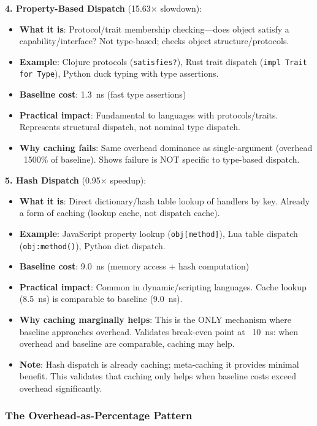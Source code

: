 \documentclass[sigplan,final]{acmart}
\begin{document}
\textbf{4. Property-Based Dispatch} (15.63× slowdown):
\begin{itemize}
  \item \textbf{What it is}: Protocol/trait membership checking—does object satisfy a capability/interface? Not type-based; checks object structure/protocols.
  \item \textbf{Example}: Clojure protocols (\texttt{satisfies?}), Rust trait dispatch (\texttt{impl Trait for Type}), Python duck typing with type assertions.
  \item \textbf{Baseline cost}: 1.3~ns (fast type assertions)
  \item \textbf{Practical impact}: Fundamental to languages with protocols/traits. Represents structural dispatch, not nominal type dispatch.
  \item \textbf{Why caching fails}: Same overhead dominance as single-argument (overhead ~1500\% of baseline). Shows failure is NOT specific to type-based dispatch.
\end{itemize}

\textbf{5. Hash Dispatch} (0.95× speedup):
\begin{itemize}
  \item \textbf{What it is}: Direct dictionary/hash table lookup of handlers by key. Already a form of caching (lookup cache, not dispatch cache).
  \item \textbf{Example}: JavaScript property lookup (\texttt{obj[method]}), Lua table dispatch (\texttt{obj:method()}), Python dict dispatch.
  \item \textbf{Baseline cost}: 9.0~ns (memory access + hash computation)
  \item \textbf{Practical impact}: Common in dynamic/scripting languages. Cache lookup (8.5~ns) is comparable to baseline (9.0~ns).
  \item \textbf{Why caching marginally helps}: This is the ONLY mechanism where baseline approaches overhead. Validates break-even point at ~10~ns: when overhead and baseline are comparable, caching may help.
  \item \textbf{Note}: Hash dispatch is already caching; meta-caching it provides minimal benefit. This validates that caching only helps when baseline costs exceed overhead significantly.
\end{itemize}

\subsubsection{The Overhead-as-Percentage Pattern}
\end{document}
